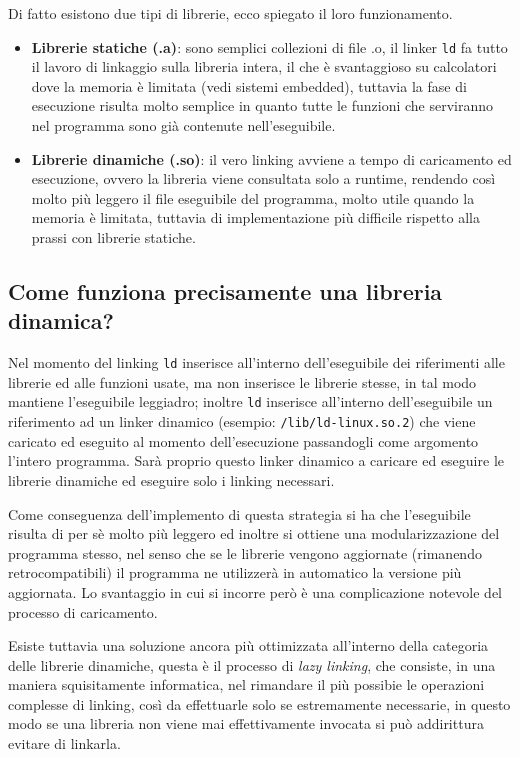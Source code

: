 \documentclass[class=book, crop=false, oneside]{standalone}
\begin{document}
Di fatto esistono due tipi di librerie, ecco spiegato il loro funzionamento.
\begin{itemize}
	\item \textbf{Librerie statiche (.a)}: sono semplici collezioni di file .o, il linker \texttt{ld} fa tutto il lavoro di linkaggio sulla libreria intera, il che è svantaggioso su calcolatori dove la memoria è limitata (vedi sistemi embedded), tuttavia la fase di esecuzione risulta molto semplice in quanto tutte le funzioni che serviranno nel programma sono già contenute nell'eseguibile.
	\item \textbf{Librerie dinamiche (.so)}: il vero linking avviene a tempo di caricamento ed esecuzione, ovvero la libreria viene consultata solo a runtime, rendendo così molto più leggero il file eseguibile del programma, molto utile quando la memoria è limitata, tuttavia di implementazione più difficile rispetto alla prassi con librerie statiche.
\end{itemize}

\subsection{Come funziona precisamente una libreria dinamica?}

Nel momento del linking \texttt{ld} inserisce all'interno dell'eseguibile dei riferimenti alle librerie ed alle funzioni usate, ma non inserisce le librerie stesse, in tal modo mantiene l'eseguibile leggiadro; inoltre \texttt{ld} inserisce all'interno dell'eseguibile un riferimento ad un linker dinamico (esempio: \texttt{/lib/ld-linux.so.2}) che viene caricato ed eseguito al momento dell'esecuzione passandogli come argomento l'intero programma.
Sarà proprio questo linker dinamico a caricare ed eseguire le librerie dinamiche ed eseguire solo i linking necessari.

Come conseguenza dell'implemento di questa strategia si ha che l'eseguibile risulta di per sè molto più leggero ed inoltre si ottiene una modularizzazione del programma stesso, nel senso che se le librerie vengono aggiornate (rimanendo retrocompatibili) il programma ne utilizzerà in automatico la versione più aggiornata.
Lo svantaggio in cui si incorre però è una complicazione notevole del processo di caricamento.

Esiste tuttavia una soluzione ancora più ottimizzata all'interno della categoria delle librerie dinamiche, questa è il processo di \emph{lazy linking}, che consiste, in una maniera squisitamente informatica, nel rimandare il più possibie le operazioni complesse di linking, così da effettuarle solo se estremamente necessarie, in questo modo se una libreria non viene mai effettivamente invocata si può addirittura evitare di linkarla.
\end{document}
